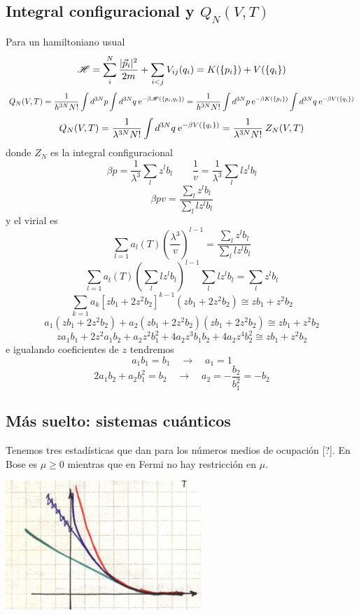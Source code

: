 \documentclass[10pt,oneside]{CBFT_book}
\begin{document}
\subsection{Integral configuracional y $Q_N(V,T)$}

Para un hamiltoniano usual
\[
	\mathscr{H} = \sum_i^N \frac{|\vec{p}_i|^2}{2m} + \sum_{i<j} V_{ij}(q_i) = K(\{ p_i \}) + V(\{ q_i \})
\]
\[
	Q_N(V,T) = \frac{1}{h^{3N}N!}\int d^{3N}p \int d^{3N}q \:\mathrm{e}^{-\beta \mathscr{H}(\{ p_i,q_i \})} =
	\frac{1}{h^{3N}N!}\int d^{3N}p \:\mathrm{e}^{-\beta K(\{ p_i \})}  \int d^{3N}q \:\mathrm{e}^{-\beta V(\{ q_i \}) } 
\]
\[
	Q_N(V,T) = \frac{1}{\lambda^{3N}N!} \int d^{3N}q \:\mathrm{e}^{-\beta V(\{ q_i \}) }  =
	\frac{1}{\lambda^{3N}N!} \: Z_N(V,T)
\]
donde $Z_N$ es la integral configuracional
\[
	\beta p = \frac{1}{\lambda^3} \sum_l z^l b_l  \qquad \frac{1}{v} = \frac{1}{\lambda^3} \sum_l lz^l b_l 
\]
\[
	\beta p v = \frac{ \sum_l z^l b_l }{ \sum_l l z^l b_l  }
\]
y el virial es 
\[
	\sum_{l=1} a_l(T) \left( \frac{\lambda^3}{v} \right)^{l-1} = \frac{ \sum_l z^l b_l }{ \sum_l l z^l b_l  }
\]
\[
	\sum_{l=1} a_l(T) \left( \sum_l l z^l b_l \right)^{l-1} \sum_l l z^l b_l = \sum_l z^l b_l 
\]
\[
	\sum_{k=1} a_k [ zb_1 + 2z^2b_2 ]^{k-1} (zb_1+2z^2b_2) \cong zb_1 + z^2b_2
\]
\[
	a_1(zb_1+2z^2b_2) + a_2(zb_1+2z^2b_2) (zb_1+2z^2b_2) \cong zb_1 + z^2b_2
\]
\[
	za_1b_1 + 2z^2a_1b_2 + a_2z^2b_1^2 + 4a_2z^3b_1b_2 + 4 a_2 z^4 b_2^2 \cong zb_1 + z^2b_2
\]
e igualando coeficientes de $ z $ tendremos 
\[
 	a_1b_1 = b_1 \quad \rightarrow \quad a_1 = 1
\]
\[
	2a_1b_2 + a_2b_1^2 = b_2  \quad \rightarrow \quad  a_2 = -\frac{b_2}{b_1^2} = -b_2
\]

\subsection{Más suelto: sistemas cuánticos}

Tenemos tres estadísticas que dan para los números medios de ocupación [?]. En Bose es
$\mu \geq 0$ mientras que en Fermi no hay restricción en $\mu$.

\includegraphics[scale=0.5]{images/1606329505.jpg}
\end{document}
